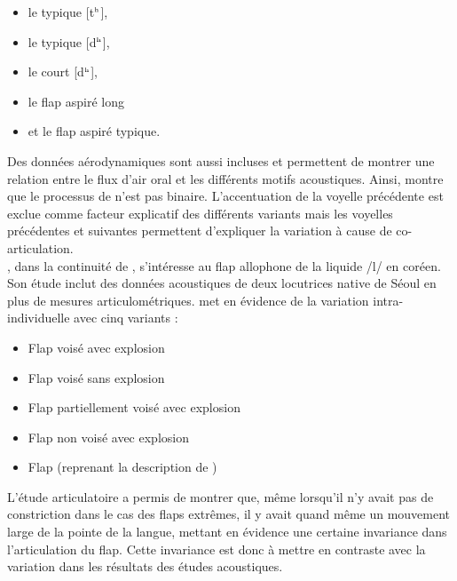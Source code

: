 \begin{itemize}
\item le typique [t$^\textrm{\tiny h}$],
\item le typique [d$^\textrm{\tiny h}$],
\item le court [d$^\textrm{\tiny h}$],
\item le flap aspiré long
\item et le flap aspiré typique.
\end{itemize} 

Des données aérodynamiques sont aussi incluses et permettent de montrer une relation entre le flux d'air oral et les différents motifs acoustiques.
Ainsi, \textcite{zengUnderstandingFlappingXiangxiang2007} montre que le processus de  n'est pas binaire. L'accentuation de la voyelle précédente est exclue comme facteur explicatif des différents variants mais les voyelles précédentes et suivantes permettent d'expliquer la variation à cause de co-articulation.\\

\textcite{sonPitfallsSpectrogramReadings2008}, dans la continuité de \textcite{zengUnderstandingFlappingXiangxiang2007}, s'intéresse au flap allophone de la liquide /l/ en coréen. Son étude inclut des données acoustiques de deux locutrices native de Séoul en plus de mesures articulométriques. \citeauthor{sonPitfallsSpectrogramReadings2008} met en évidence de la variation intra-individuelle avec cinq variants :

\begin{itemize}
	\item Flap voisé avec explosion
	\item Flap voisé sans explosion
	\item Flap partiellement voisé avec explosion
	\item Flap non voisé avec explosion
	\item Flap  (reprenant la description de \textcite{zengUnderstandingFlappingXiangxiang2007})
\end{itemize}

L'étude articulatoire a permis de montrer que, même lorsqu'il n'y avait pas de constriction dans le cas des flaps extrêmes, il y avait quand même un mouvement large de la pointe de la langue, mettant en évidence une certaine invariance dans l'articulation du flap. Cette invariance est donc à mettre en contraste avec la variation dans les résultats des études acoustiques.\\

